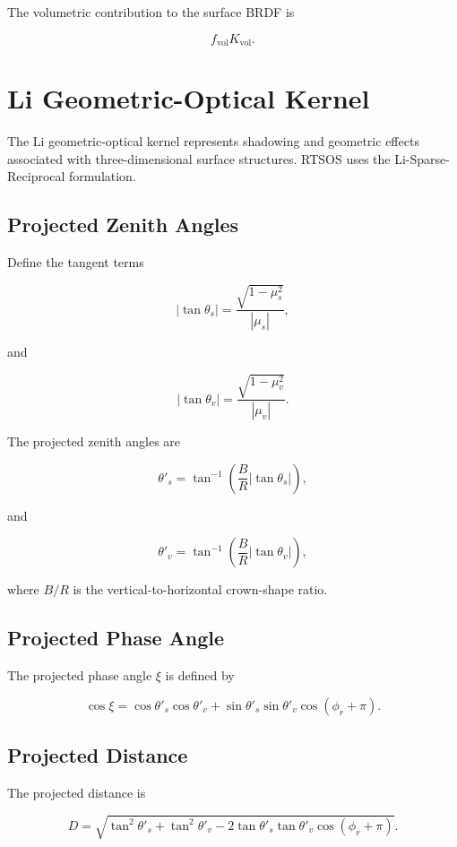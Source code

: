 \documentclass[
  11pt,
  letterpaper,
]{scrreprt}
\begin{document}
The volumetric contribution to the surface BRDF is

\[
f_{\mathrm{vol}}K_{\mathrm{vol}}.
\]

\section{Li Geometric-Optical Kernel}\label{li-geometric-optical-kernel}

The Li geometric-optical kernel represents shadowing and geometric
effects associated with three-dimensional surface structures. RTSOS uses
the Li-Sparse-Reciprocal formulation.

\subsection{Projected Zenith Angles}\label{projected-zenith-angles}

Define the tangent terms

\[
|\tan\theta_s|
=
\frac{\sqrt{1-\mu_s^2}}{|\mu_s|},
\]

and

\[
|\tan\theta_v|
=
\frac{\sqrt{1-\mu_v^2}}{|\mu_v|}.
\]

The projected zenith angles are

\[
\theta'_s
=
\tan^{-1}
\left(
\frac{B}{R}|\tan\theta_s|
\right),
\]

and

\[
\theta'_v
=
\tan^{-1}
\left(
\frac{B}{R}|\tan\theta_v|
\right),
\]

where \(B/R\) is the vertical-to-horizontal crown-shape ratio.

\subsection{Projected Phase Angle}\label{projected-phase-angle}

The projected phase angle \(\xi\) is defined by

\[
\cos\xi
=
\cos\theta'_s\cos\theta'_v
+
\sin\theta'_s\sin\theta'_v
\cos(\phi_r+\pi).
\]

\subsection{Projected Distance}\label{projected-distance}

The projected distance is

\[
D
=
\sqrt{
\tan^2\theta'_s
+
\tan^2\theta'_v
-
2\tan\theta'_s\tan\theta'_v
\cos(\phi_r+\pi)
}.
\]
\end{document}
